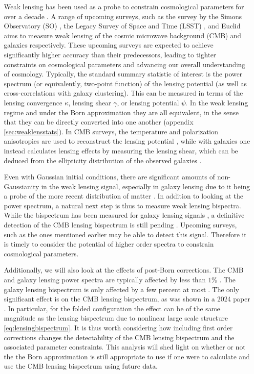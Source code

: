 \documentclass[11pt]{article} %
\begin{document}
Weak lensing has been used as a probe to constrain cosmological parameters for over a decade \cite{kilbinger2015cosmology,Bacon2000,Kaiser2000,Waerbeke2000,Bartelmann2001,Planck2018Lensing}. A range of upcoming surveys, such as the survey by the Simons Observatory (SO) \cite{Ade2019}, the Legacy Survey of Space and Time (LSST) \cite{Ivezic2019}, and Euclid \cite{Laureijs2011} aims to measure weak lensing of the cosmic microwave background (CMB) and galaxies respectively. These upcoming surveys are expected to achieve significantly higher accuracy than their predecessors, leading to tighter constraints on cosmological parameters and advancing our overall understanding of cosmology. Typically, the standard summary statistic of interest is the power spectrum (or equivalently, two-point function) of the lensing potential (as well as cross-correlations with galaxy clustering). This can be measured in terms of the lensing convergence $\kappa$, lensing shear $\gamma$, or lensing potential $\psi$. In the weak lensing regime and under the Born approximation they are all equivalent, in the sense that they can be directly converted into one another (appendix \ref{sec:weaklensstats}). In CMB surveys, the temperature and polarization anisotropies are used to reconstruct the lensing potential \cite{Hu_2002}, while with galaxies one instead calculates lensing effects by measuring the lensing shear, which can be deduced from the ellipticity distribution of the observed galaxies \cite{HoekstraJain2008}.

Even with Gaussian initial conditions, there are significant amounts of non-Gaussianity in the weak lensing signal, especially in galaxy lensing due to it being a probe of the more recent distribution of matter \cite{Bernardeau1997,Takada2003}. In addition to looking at the power spectrum, a natural next step is thus to measure weak lensing bispectra. While the bispectrum has been measured for galaxy lensing signals \cite{vanWaerbeke2002}, a definitive detection of the CMB lensing bispectrum is still pending \cite{Kalaja_2023,Namikawa_2016}. Upcoming surveys, such as the ones mentioned earlier may be able to detect this signal. Therefore it is timely to consider the potential of higher order spectra to constrain cosmological parameters.

Additionally, we will also look at the effects of post-Born corrections. The CMB and galaxy lensing power spectra are typically affected by less than $1\%$ \cite{postborn_pratten_lewis, galpostbornlpscorr}. The galaxy lensing bispectrum is only affected by a few percent at most \cite{galpostbornlbscorr}. The only significant effect is on the CMB lensing bispectrum, as was shown in a 2024 paper \cite{postborn_pratten_lewis}. In particular, for the folded configuration the effect can be of the same magnitude as the lensing bispectrum due to nonlinear large scale structure \eqref{eq:lensingbispectrum}. It is thus worth considering how including first order corrections changes the detectability of the CMB lensing bispectrum and the associated parameter constraints. This analysis will shed light on whether or not the the Born approximation is still appropriate to use if one were to calculate and use the CMB lensing bispectrum using future data.
\end{document}
